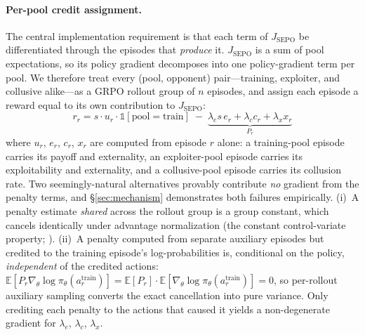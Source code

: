 \documentclass[letterpaper]{article} %
\newcommand{\Jsepo}{J_{\text{SEPO}}}
\begin{document}
\paragraph{Per-pool credit assignment.} The central implementation requirement is that each term of $\Jsepo$ be differentiated through the episodes that \emph{produce} it. $\Jsepo$ is a sum of pool expectations, so its policy gradient decomposes into one policy-gradient term per pool. We therefore treat every (pool, opponent) pair---training, exploiter, and collusive alike---as a GRPO rollout group of $n$ episodes, and assign each episode a reward equal to its own contribution to $\Jsepo$:
\begin{equation}
\label{eq:reward}
r_r = s \cdot u_r \cdot \mathbb{1}[\text{pool} = \text{train}] \;-\; \underbrace{\lambda_e s\, e_r + \lambda_c c_r + \lambda_x x_r}_{P_r}
\end{equation}
where $u_r$, $e_r$, $c_r$, $x_r$ are computed from episode $r$ alone: a training-pool episode carries its payoff and externality, an exploiter-pool episode carries its exploitability and externality, and a collusive-pool episode carries its collusion rate. Two seemingly-natural alternatives provably contribute \emph{no} gradient from the penalty terms, and \S\ref{sec:mechanism} demonstrates both failures empirically. (i)~A penalty estimate \emph{shared} across the rollout group is a group constant, which cancels identically under advantage normalization (the constant control-variate property; \citealp{williams1992simple,kool2019buy}). (ii)~A penalty computed from separate auxiliary episodes but credited to the training episode's log-probabilities is, conditional on the policy, \emph{independent} of the credited actions: $\mathbb{E}[P_r \nabla_\theta \log \pi_\theta(a^{\mathrm{train}}_r)] = \mathbb{E}[P_r] \cdot \mathbb{E}[\nabla_\theta \log \pi_\theta(a^{\mathrm{train}}_r)] = 0$, so per-rollout auxiliary sampling converts the exact cancellation into pure variance. Only crediting each penalty to the actions that caused it yields a non-degenerate gradient for $\lambda_e$, $\lambda_c$, $\lambda_x$.
\end{document}
